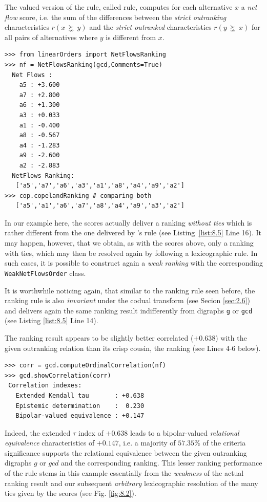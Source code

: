 The valued version of the \Copeland rule, called \NetFlows rule, computes for each alternative $x$ a \emph{net flow} score,  i.e. the sum of the differences between the \emph{strict outranking} characteristics $r(x\, \succnsim \,y)$ and the \emph{strict outranked} characteristics $r(y\, \succnsim \,x)$ for all pairs of alternatives where $y$ is different from $x$.
  \begin{lstlisting}[caption={Computing a \NetFlows ranking},label=list:8.5]
>>> from linearOrders import NetFlowsRanking
>>> nf = NetFlowsRanking(gcd,Comments=True)
  Net Flows :
    a5 : +3.600
    a7 : +2.800
    a6 : +1.300
    a3 : +0.033
    a1 : -0.400
    a8 : -0.567
    a4 : -1.283
    a9 : -2.600
    a2 : -2.883
  NetFlows Ranking:
   ['a5','a7','a6','a3','a1','a8','a4','a9','a2']
>>> cop.copelandRanking # comparing both
   ['a5','a1','a6','a7','a8','a4','a9','a3','a2']
\end{lstlisting}
In our example here, the \NetFlows scores actually deliver a ranking \emph{without ties} which is rather different from the one delivered by \Copeland 's rule (see Listing~\ref{list:8.5} Line 16). It may happen, however, that we obtain, as with the \Copeland scores above, only a ranking with ties, which may then be resolved again by following a lexicographic rule. In such cases, it is possible to construct again a \emph{weak ranking} with the corresponding \texttt{WeakNetFlowsOrder} class.

It is worthwhile noticing again, that similar to the \Copeland ranking rule seen before, the \NetFlows ranking rule is also \emph{invariant} under the codual transform (see Secion \ref{sec:2.6}) and delivers again the same ranking result indifferently from digraphs \texttt{g} or \texttt{gcd} (see Listing \ref{list:8.5} Line 14). 

The \NetFlows ranking result appears to be slightly better correlated ($+0.638$) with the given outranking relation than its crisp cousin, the \Copeland ranking (see Lines 4-6 below).
\begin{lstlisting}[caption={Checking the quality of the \NetFlows Ranking},label=list:8.6]   
>>> corr = gcd.computeOrdinalCorrelation(nf)
>>> gcd.showCorrelation(corr)
 Correlation indexes:
   Extended Kendall tau       : +0.638
   Epistemic determination    :  0.230
   Bipolar-valued equivalence : +0.147
\end{lstlisting}
Indeed, the extended \Kendall $\tau$ index of $+0.638$ leads to a bipolar-valued \emph{relational equivalence} characteristics of $+0.147$, i.e. a majority of $57.35\%$ of the criteria significance supports the relational equivalence between the given outranking digraphs $g$ or $gcd$  and the corresponding \NetFlows ranking. This lesser ranking performance of the \Copeland rule stems in this example essentially from the \emph{weakness} of the actual ranking result and our subsequent \emph{arbitrary} lexicographic resolution of the many ties given by the \Copeland scores (see Fig. \ref{fig:8.2}).

